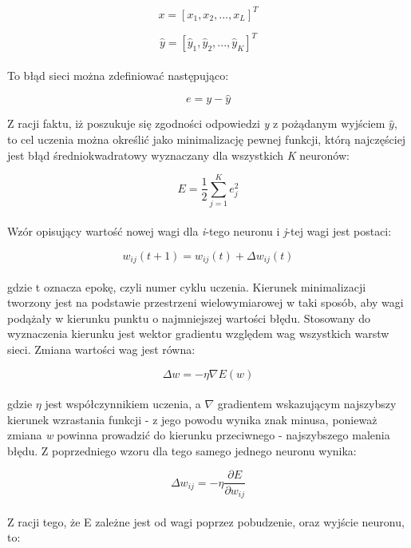 \documentclass[a4paper, 12pt]{article}
\begin{document}
\begin{equation}
x = [x_1, x_2, ..., x_L]^{T}
\label{Eq:2.13}
\end{equation}

\begin{equation}
\widehat{y} = [\widehat{y}_1, \widehat{y}_2, ..., \widehat{y}_K]^{T}
\label{Eq:2.14}
\end{equation}\\
To błąd sieci można zdefiniować następująco:

\begin{equation}
e = y - \widehat{y}
\label{Eq:2.15}
\end{equation}

\newpage
Z racji faktu, iż poszukuje się zgodności odpowiedzi \textit{y} z pożądanym wyjściem $\widehat{y}$, to cel uczenia można określić jako minimalizację pewnej funkcji, którą najczęściej jest błąd średniokwadratowy wyznaczany dla wszystkich \textit{K} neuronów:

\begin{equation}
E = \frac{1}{2} {\sum_{j=1}^{K}  e^{2}_j}
\label{Eq:2.16}
\end{equation}\\
Wzór opisujący wartość nowej wagi dla \textit{i}-tego neuronu i \textit{j}-tej wagi jest postaci: 

\begin{equation}
w_{ij}(t + 1) = w_{ij}(t) + \Delta w_{ij}(t)
\label{Eq:2.17}
\end{equation}\\
gdzie t oznacza epokę, czyli numer cyklu uczenia. Kierunek minimalizacji tworzony jest na podstawie przestrzeni wielowymiarowej w taki sposób, aby wagi podążały w kierunku punktu o najmniejszej wartości błędu. Stosowany do wyznaczenia kierunku jest wektor gradientu względem wag wszystkich warstw sieci. Zmiana wartości wag jest równa: 

\begin{equation}
\Delta w = - \eta \nabla E(w)
\label{Eq:2.18}
\end{equation}\\
gdzie $\eta$ jest współczynnikiem uczenia, a $\nabla$ gradientem wskazującym najszybszy kierunek wzrastania funkcji - z jego powodu wynika znak minusa, ponieważ zmiana \textit{w} powinna prowadzić do kierunku przeciwnego - najszybszego malenia błędu. Z poprzedniego wzoru dla tego samego jednego neuronu wynika:

\begin{equation}
\Delta w_{ij} = - \eta \frac{\partial E}{\partial w_{ij}}
\label{Eq:2.19}
\end{equation}\\
Z racji tego, że E zależne jest od wagi poprzez pobudzenie, oraz wyjście neuronu, to:
\end{document}
